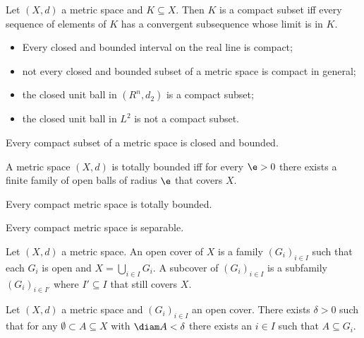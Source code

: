 \documentclass{article}
\begin{document}
\begin{definition}
	Let $(X,d)$ a metric space and $K\subseteq X$. Then $K$ is a compact subset iff
	every sequence of elements of $K$ has a convergent subsequence whose limit is in
	$K$.
\end{definition}
\begin{itemize}
	\item Every closed and bounded interval on the real line is compact;
	\item not every closed and bounded subset of a metric space is compact in general;
	\item the closed unit ball in $(R^n,d_2)$ is a compact subset;
	\item the closed unit ball in $L^2$ is not a compact subset.
\end{itemize}

\begin{proposition}[9.7, 9.8]
	Every compact subset of a metric space is closed and bounded.
\end{proposition}

\begin{definition}
	A metric space $(X,d)$ is totally bounded iff for every $\e>0$ there exists a
	finite family of open balls of radius $\e$ that covers $X$.
\end{definition}

\begin{proposition}[9.13]
	Every compact metric space is totally bounded.
\end{proposition}

\begin{proposition}[9.14]
	Every compact metric space is separable.
\end{proposition}

\begin{definition}
	Let $(X,d)$ a metric space. An open cover of $X$ is a family $(G_i)_{i\in I}$ such
	that each $G_i$ is open and $X=\bigcup_{i\in I}G_i$. A subcover of $(G_i)_{i\in I}$
	is a subfamily $(G_i)_{i\in I'}$ where $I'\subseteq I$ that still covers $X$.
\end{definition}

\begin{proposition}
	Let $(X,d)$ a metric space and $(G_i)_{i\in I}$ an open cover. There exists
	$\delta>0$ such that for any $\emptyset\subset A\subseteq X$ with $\diam A < \delta$
	there exists an $i\in I$ such that $A\subseteq G_i$.
\end{proposition}
\end{document}
